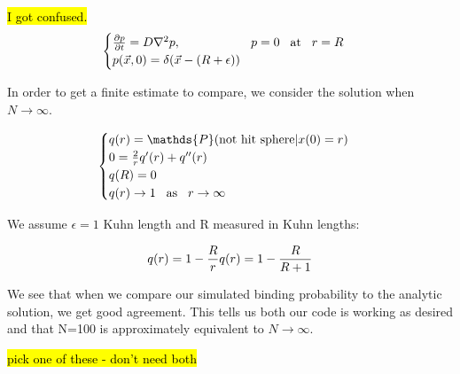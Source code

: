 \documentclass[../AdvancementSummary.tex]{subfiles}
\begin{document}
\hl{I got confused.}
\begin{equation}\label{eq: diffusion}
	\begin{cases}
		\frac{\partial p}{\partial t} = D \nabla^2 p, \hspace{2cm} p=0 \hspace{3mm}\text{at}\hspace{3mm} r=R\\
		p(\vec{x},0) = \delta(\vec{x}-(R+\epsilon))\\
	\end{cases}
\end{equation}

In order to get a finite estimate to compare, we consider the solution when $N\rightarrow \infty$.

 \begin{equation}\label{eq: analytic}
  	\begin{cases}
 	q(r)=\mathds{P}(\text{not hit sphere}|x(0)=r) \\
 	0=\frac{2}{r}q'(r)+q''(r) \\
 	q(R) = 0 \\
 	q(r) \rightarrow 1 \hspace{3mm}\text{as}\hspace{3mm} r \rightarrow \infty \\
 	\end{cases}
 \end{equation}

 We assume $\epsilon = 1$ Kuhn length and R measured in Kuhn lengths:

 \begin{equation}\label{eq: analyticSolution}
q(r) = 1-\frac{R}{r}\\
q(r) = 1-\frac{R}{R+1} \\
 \end{equation}
 
 We see that when we compare our simulated binding probability to the analytic solution, we get good agreement. This tells us both our code is working as desired and that N=100 is approximately equivalent to $N \rightarrow \infty$.

\hl{pick one of these - don't need both}
\end{document}

